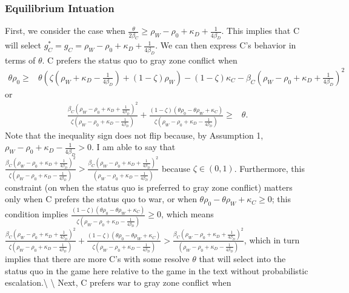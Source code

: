 \documentclass[
]{article}
\begin{document}
\hypertarget{equilibrium-intuation}{%
\subsubsection{Equilibrium Intuation}\label{equilibrium-intuation}}

First, we consider the case when
\(\frac{\theta}{2\beta_{C}}\geq\rho_{W}-\rho_{0}+\kappa_{D}+\frac{1}{4\beta_{D}}\).
This implies that C will select
\(g_{C}^{*}=\hat{g_{C}}=\rho_{W}-\rho_{0}+\kappa_{D}+\frac{1}{4\beta_{D}}\).
We can then express C's behavior in terms of \(\theta\). C prefers the
status quo to gray zone conflict when \begin{align*}
\theta\rho_{0}\geq & \theta\left(\zeta\left(\rho_{W}+\kappa_{D}-\frac{1}{4\beta_{D}}\right)+(1-\zeta)\rho_{W}\right)-(1-\zeta)\kappa_{C}-\beta_{C}\left(\rho_{W}-\rho_{0}+\kappa_{D}+\frac{1}{4\beta_{D}}\right)^{2}
\end{align*} or \begin{align*}
\frac{\beta_{C}\left(\rho_{W}-\rho_{0}+\kappa_{D}+\frac{1}{4\beta_{D}}\right)^{2}}{\zeta\left(\rho_{W}-\rho_{0}+\kappa_{D}-\frac{1}{4\beta_{D}}\right)}+\frac{(1-\zeta)(\theta\rho_{0}-\theta\rho_{W}+\kappa_{C})}{\zeta\left(\rho_{W}-\rho_{0}+\kappa_{D}-\frac{1}{4\beta_{D}}\right)}\geq & \theta.
\end{align*} Note that the inequality sign does not flip because, by
Assumption 1, \(\rho_{W}-\rho_{0}+\kappa_{D}-\frac{1}{4\beta_{D}}>0\). I
am able to say that
\(\frac{\beta_{C}\left(\rho_{W}-\rho_{0}+\kappa_{D}+\frac{1}{4\beta_{D}}\right)^{2}}{\zeta\left(\rho_{W}-\rho_{0}+\kappa_{D}-\frac{1}{4\beta_{D}}\right)}>\frac{\beta_{C}\left(\rho_{W}-\rho_{0}+\kappa_{D}+\frac{1}{4\beta_{D}}\right)^{2}}{\left(\rho_{W}-\rho_{0}+\kappa_{D}-\frac{1}{4\beta_{D}}\right)}\)
because \(\zeta\in(0,1)\). Furthermore, this constraint (on when the
status quo is preferred to gray zone conflict) matters only when C
prefers the status quo to war, or when
\(\theta\rho_{0}-\theta\rho_{W}+\kappa_{C}\geq0\); this condition
implies
\(\frac{(1-\zeta)(\theta\rho_{0}-\theta\rho_{W}+\kappa_{C})}{\zeta\left(\rho_{W}-\rho_{0}+\kappa_{D}-\frac{1}{4\beta_{D}}\right)}\geq0\),
which means
\(\frac{\beta_{C}\left(\rho_{W}-\rho_{0}+\kappa_{D}+\frac{1}{4\beta_{D}}\right)^{2}}{\zeta\left(\rho_{W}-\rho_{0}+\kappa_{D}-\frac{1}{4\beta_{D}}\right)}+\frac{(1-\zeta)(\theta\rho_{0}-\theta\rho_{W}+\kappa_{C})}{\zeta\left(\rho_{W}-\rho_{0}+\kappa_{D}-\frac{1}{4\beta_{D}}\right)}>\frac{\beta_{C}\left(\rho_{W}-\rho_{0}+\kappa_{D}+\frac{1}{4\beta_{D}}\right)^{2}}{\left(\rho_{W}-\rho_{0}+\kappa_{D}-\frac{1}{4\beta_{D}}\right)}\),
which in turn implies that there are more C's with some resolve
\(\theta\) that will select into the status quo in the game here
relative to the game in the text without probabilistic
escalation.\textbackslash{} \textbackslash{} Next, C prefers war to gray
zone conflict when
\end{document}
